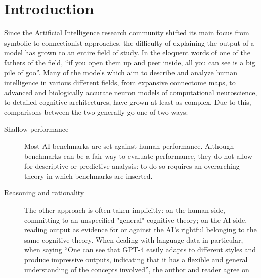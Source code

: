 \documentclass[letterpaper,11pt,twocolumn]{article}
\begin{document}
\section*{Introduction}
Since the Artificial Intelligence research community shifted its main focus from symbolic to connectionist approaches, the difficulty of explaining the output of a model has grown to an entire field of study. In the eloquent words of one of the fathers of the field, \enquote{if
    you open them up and peer inside, all you can see is a big pile of goo}\cite{mozerUsingRelevanceReduce1989a}.
Many of the models which aim to describe and analyze human intelligence in various different fields, from expansive connectome maps\cite{yeSurveyCognitiveArchitectures2018a}, to advanced and biologically accurate neuron models of computational neuroscience, to detailed cognitive architectures\cite{yeSurveyCognitiveArchitectures2018a}, have grown at least as complex. Due to this, comparisons between the two generally go one of two ways:
\begin{description}
    \item[Shallow performance] Most AI benchmarks are set against human performance. Although benchmarks can be a fair way to evaluate performance, they do not allow for descriptive or predictive analysis: to do so requires an overarching theory in which benchmarks are inserted.
    \item[Reasoning and rationality] The other approach is often taken implicitly: on the human side, committing to an unspecified "general" cognitive theory; on the AI side, reading output as evidence for or against the AI's rightful belonging to the same cognitive theory. When dealing with language data in particular, when saying
        \enquote{One can see that GPT-4 easily adapts to different styles and produce impressive outputs, indicating that it has a flexible and general understanding of the concepts involved}\cite{bubeckSparksArtificialGeneral2023},
        the author and reader agree on
\end{description}
\end{document}
